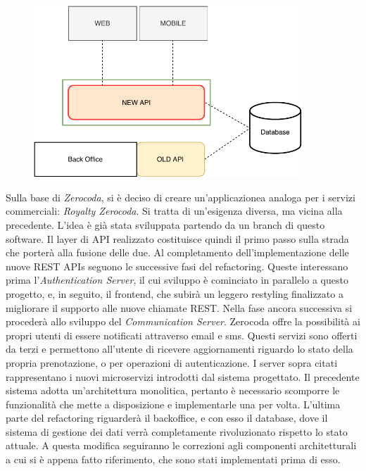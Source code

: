 \documentclass[a4paper,11pt]{article}
\begin{document}
	\begin{figure}
		\centering
		\includegraphics[width=0.90\textwidth]{images/01_nuove_api.pdf}
	\end{figure}
	Sulla base di \emph{Zerocoda}, si è deciso di creare un’applicazionea analoga per i servizi commerciali: \emph{Royalty Zerocoda}. Si tratta di un’esigenza diversa, ma vicina alla precedente. L’idea è già stata sviluppata partendo da un branch di questo software. Il layer di API realizzato costituisce quindi il primo passo sulla strada che porterà alla fusione delle due. Al completamento dell'implementazione delle nuove REST APIs seguono le successive fasi del refactoring. Queste interessano prima l'\textit{Authentication Server}, il cui sviluppo è cominciato in parallelo a questo progetto, e, in seguito, il frontend, che subirà un leggero restyling finalizzato a migliorare il supporto alle nuove chiamate REST. Nella fase ancora successiva si procederà allo sviluppo del \textit{Communication Server}. Zerocoda offre la possibilità ai propri utenti di essere notificati attraverso email e sms. Questi servizi sono offerti da terzi e permettono all'utente di ricevere aggiornamenti riguardo lo stato della propria prenotazione, o per operazioni di autenticazione. I server sopra citati rappresentano i nuovi microservizi introdotti dal sistema progettato. Il precedente sistema adotta un'architettura monolitica, pertanto è necessario scomporre le funzionalità che mette a disposizione e implementarle una per volta. L'ultima parte del refactoring riguarderà il backoffice, e con esso il database, dove il sistema di gestione dei dati verrà completamente rivoluzionato rispetto lo stato attuale. A questa modifica seguiranno le correzioni agli componenti architetturali a cui si è appena fatto riferimento, che sono stati implementati prima di esso. 

   	
\end{document}
